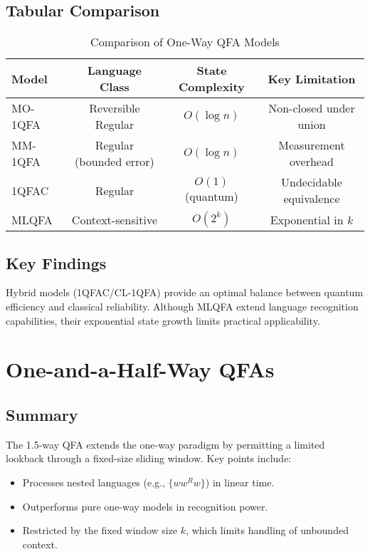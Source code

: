 \subsection{Tabular Comparison}
\begin{table}[ht]
\centering
\caption{Comparison of One-Way QFA Models}
\label{tab:one_way}
\begin{tabular}{|l|c|c|c|}
\hline
\textbf{Model} & \textbf{Language Class} & \textbf{State Complexity} & \textbf{Key Limitation} \\ \hline
MO-1QFA   & Reversible Regular & $O(\log n)$ & Non-closed under union \\ \hline
MM-1QFA   & Regular (bounded error) & $O(\log n)$ & Measurement overhead \\ \hline
1QFAC     & Regular & $O(1)$ (quantum) & Undecidable equivalence \\ \hline
MLQFA     & Context-sensitive & $O(2^k)$ & Exponential in $k$ \\ \hline
\end{tabular}
\end{table}

\subsection{Key Findings}
Hybrid models (1QFAC/CL-1QFA) provide an optimal balance between quantum efficiency and classical reliability. Although MLQFA extend language recognition capabilities, their exponential state growth limits practical applicability.

\section{One-and-a-Half-Way QFAs}

\subsection{Summary}
The 1.5-way QFA extends the one-way paradigm by permitting a limited lookback through a fixed-size sliding window. Key points include:
\begin{itemize}
    \item Processes nested languages (e.g., $\{ww^Rw\}$) in linear time.
    \item Outperforms pure one-way models in recognition power.
    \item Restricted by the fixed window size $k$, which limits handling of unbounded context.
\end{itemize}


